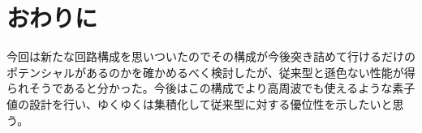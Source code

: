 \documentclass[twocolumn]{jsarticle}
\begin{document}
\section{おわりに}
    今回は新たな回路構成を思いついたのでその構成が今後突き詰めて行けるだけのポテンシャルがあるのかを確かめるべく検討したが、従来型と遜色ない性能が得られそうであると分かった。今後はこの構成でより高周波でも使えるような素子値の設計を行い、ゆくゆくは集積化して従来型に対する優位性を示したいと思う。
\end{document}
